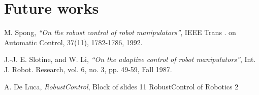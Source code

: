 \documentclass{article}
\begin{document}
\section{Future works}



\begin{thebibliography}{9}

  M. Spong,
  \emph{“On the robust control of robot manipulators”},
   IEEE Trans . on Automatic Control, 37(11), 1782-1786, 1992.

  J.-J. E. Slotine, and W. Li,
  \emph{“On the adaptive control of robot manipulators”},
  Int. J. Robot. Research, vol. 6, no. 3, pp. 49-59, Fall 1987.
   
  A. De Luca,
  \emph{RobustControl},
 Block of slides 11 RobustControl of Robotics 2

\end{thebibliography}
\end{document}
